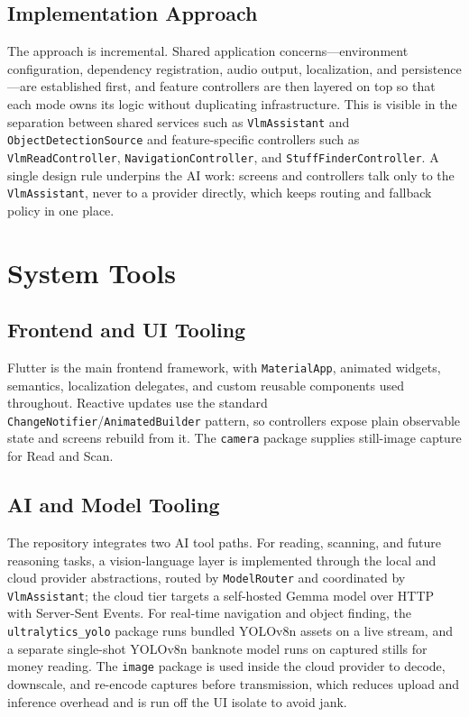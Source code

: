 \documentclass[12pt,a4paper]{report}
\begin{document}
\subsection{Implementation Approach}
The approach is incremental. Shared application concerns---environment configuration, dependency registration, audio output, localization, and persistence---are established first, and feature controllers are then layered on top so that each mode owns its logic without duplicating infrastructure. This is visible in the separation between shared services such as \texttt{VlmAssistant} and \texttt{ObjectDetectionSource} and feature-specific controllers such as \texttt{VlmReadController}, \texttt{NavigationController}, and \texttt{StuffFinderController}. A single design rule underpins the AI work: screens and controllers talk only to the \texttt{VlmAssistant}, never to a provider directly, which keeps routing and fallback policy in one place.

\section{System Tools}
\subsection{Frontend and UI Tooling}
Flutter is the main frontend framework, with \texttt{MaterialApp}, animated widgets, semantics, localization delegates, and custom reusable components used throughout. Reactive updates use the standard \texttt{ChangeNotifier}/\texttt{AnimatedBuilder} pattern, so controllers expose plain observable state and screens rebuild from it. The \texttt{camera} package supplies still-image capture for Read and Scan.

\subsection{AI and Model Tooling}
The repository integrates two AI tool paths. For reading, scanning, and future reasoning tasks, a vision-language layer is implemented through the local and cloud provider abstractions, routed by \texttt{ModelRouter} and coordinated by \texttt{VlmAssistant}; the cloud tier targets a self-hosted Gemma model over HTTP with Server-Sent Events. For real-time navigation and object finding, the \texttt{ultralytics\_yolo} package runs bundled YOLOv8n assets on a live stream, and a separate single-shot YOLOv8n banknote model runs on captured stills for money reading. The \texttt{image} package is used inside the cloud provider to decode, downscale, and re-encode captures before transmission, which reduces upload and inference overhead and is run off the UI isolate to avoid jank.
\end{document}
